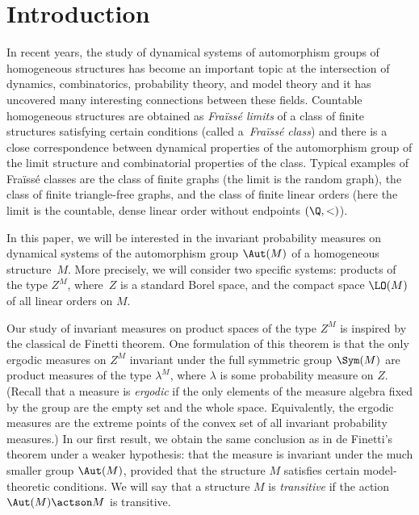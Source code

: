 \section{Introduction}
\label{sec:introduction}

In recent years, the study of dynamical systems of automorphism groups of homo\-ge\-neous structures has become an important topic at the intersection of dynamics, combinatorics, probability theory, and model theory and it has uncovered many \hbox{interesting} connections between these fields. Countable homogeneous structures are obtained as \emph{Fraïssé limits} of a class of finite structures satisfying certain conditions (called a~\emph{Fraïssé class}) and there is a close correspondence between dynamical \hbox{properties} of the automorphism group of the limit structure and combinatorial properties of the class. Typical examples of Fraïssé classes are the class of finite graphs (the limit is the random graph), the class of finite triangle-free graphs, and the class of finite linear orders (here the limit is the countable, dense linear order without endpoints $(\Q, <)$).

In this paper, we will be interested in the invariant probability measures on dynamical systems of the automorphism group $\Aut(M)$ of a homogeneous structure~$M$. More precisely, we will consider two specific systems: products of the type $Z^M$, where~$Z$ is a standard Borel space, and the compact space $\LO(M)$ of all linear orders on $M$.\enlargethispage{.5\baselineskip}%

Our study of invariant measures on product spaces of the type $Z^M$ is inspired by the classical de Finetti theorem. One formulation of this theorem is that the only ergodic measures on $Z^M$ invariant under the full symmetric group $\Sym(M)$ are product measures of the type $\lambda^M$, where $\lambda$ is some probability measure on $Z$. (Recall that a measure is \emph{ergodic} if the only elements of the measure algebra fixed by the group are the empty set and the whole space. Equivalently, the ergodic measures are the extreme points of the convex set of all invariant probability measures.) In our first result, we obtain the same conclusion as in de Finetti's theorem under a weaker hypothesis: that the measure is invariant under the much smaller group $\Aut(M)$, provided that the structure $M$ satisfies certain model-theoretic conditions. We will say that a structure $M$ is \emph{transitive} if the action $\Aut(M) \actson M$ is transitive.

